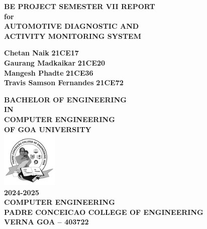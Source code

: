 \documentclass[12pt,a4paper]{report}
\begin{document}
\begin{titlepage}
    \centering
    \vspace*{0.5cm}
    
    {\Large \textbf{BE PROJECT SEMESTER VII REPORT}}\\[0.3cm]
    {\Large \textbf{for}}\\[0.3cm]
    {\Large \textbf{AUTOMOTIVE DIAGNOSTIC AND }}\\[0.3cm]
    {\Large \textbf{ACTIVITY MONITORING SYSTEM}}\\[0.5cm]

    \large
    \begin{center}
        {\textbf{Chetan Naik}} \hspace{3.7cm} {\textbf{21CE17}}\\[0.1cm]
        {\textbf{Gaurang Madkaikar}} \hspace{2cm} {\textbf{21CE20}}\\[0.1cm]
        {\textbf{Mangesh Phadte}} \hspace{2.8cm} {\textbf{21CE36}}\\[0.1cm]
        {\textbf{Travis Samson Fernandes}} \hspace{0.8cm} {\textbf{21CE72}}
    \end{center}
    
    {\large \textbf{BACHELOR OF ENGINEERING}}\\[0.3cm]
    {\large \textbf{IN}}\\[0.3cm]
    {\large \textbf{COMPUTER ENGINEERING}}\\[0.3cm]
    {\large \textbf{OF GOA UNIVERSITY}}\\[1cm]
    
    \includegraphics[width=0.2\textwidth]{assets/logo.png}\\[0.2cm]
    
    {\LARGE \textbf{2024-2025}}\\[1cm]
    
    \large
    \textbf{COMPUTER ENGINEERING}\\[0.3cm]
    \textbf{PADRE CONCEICAO COLLEGE OF ENGINEERING}\\[0.3cm]
    \textbf{VERNA GOA -- 403722}
\end{titlepage}
\end{document}

